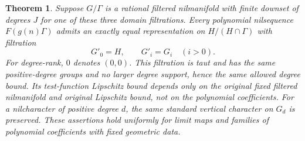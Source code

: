 \documentclass[11pt]{article}
\newtheorem{theorem}{Theorem}
\begin{document}
\begin{theorem}\label{thm:taut}
Suppose $G/\Gamma$ is a rational filtered nilmanifold with finite downset of
degrees $J$ for one of these three domain filtrations. Every polynomial
nilsequence $F(g(n)\Gamma)$ admits an exactly equal representation on
$H/(H\cap\Gamma)$ with filtration
\[
 G'_0=H,\qquad G'_i=G_i\quad(i>0).
\]
For degree-rank, $0$ denotes $(0,0)$. This filtration is taut and has the
same positive-degree groups and no larger degree support, hence the same
allowed degree bound. Its test-function Lipschitz
bound depends only on the original fixed filtered nilmanifold and original
Lipschitz bound, not on the polynomial coefficients. For a nilcharacter
of positive degree $d$, the same standard vertical character on $G_d$ is
preserved. These assertions hold uniformly for limit maps and families of
polynomial coefficients with fixed geometric data.
\end{theorem}
\end{document}
